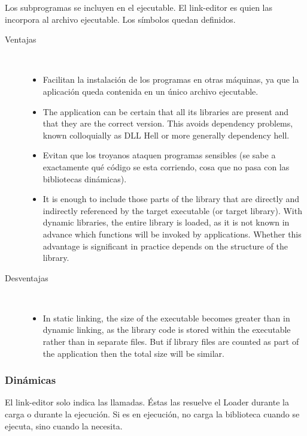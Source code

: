 \documentclass[a4paper, twoside]{article}
\begin{document}
Los subprogramas se incluyen en el ejecutable.
El link-editor es quien las incorpora al archivo ejecutable.
Los símbolos quedan definidos.

\begin{description}
  \item[Ventajas] ~
  \begin{itemize}
    \item Facilitan la instalación de los programas en otras máquinas,
    ya que la aplicación queda contenida en un único archivo ejecutable.
    \item The application can be certain that all its libraries are present and
    that they are the correct version.
    This avoids dependency problems, known colloquially as DLL Hell or more
    generally dependency hell.
    \item Evitan que los troyanos ataquen programas sensibles (se sabe a
    exactamente qué código se esta corriendo, cosa que no pasa con las
    bibliotecas dinámicas).
    \item It is enough to include those parts of the library that are directly
    and indirectly referenced by the target executable (or target library).
    With dynamic libraries, the entire library is loaded, as it is not known in
    advance which functions will be invoked by applications.
    Whether this advantage is significant in practice depends on the structure
    of the library.
  \end{itemize}

  \item[Desventajas] ~
  \begin{itemize}
    \item In static linking, the size of the executable becomes greater than in
    dynamic linking, as the library code is stored within the executable rather
    than in separate files.
    But if library files are counted as part of the application then the total
    size will be similar.
  \end{itemize}
\end{description}

\subsubsection{Dinámicas}

El link-editor solo indica las llamadas.
Éstas las resuelve el Loader durante la carga o durante la ejecución.
Si es en ejecución, no carga la biblioteca cuando se ejecuta, sino cuando la
necesita.\\
\end{document}
